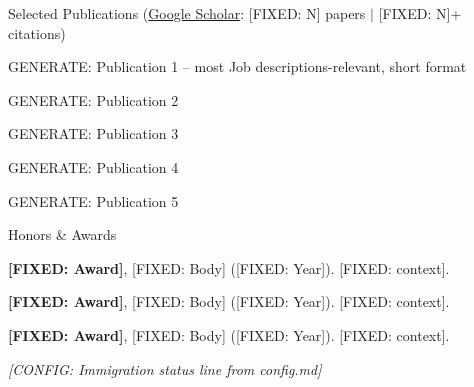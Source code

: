 \documentclass{resume}
\begin{document}
\begin{rSection2}{Selected Publications (\href{[CONFIG: Google Scholar URL]}{Google Scholar}: [FIXED: N] papers $\vert$ [FIXED: N]+ citations)}

\item [GENERATE: Publication 1 -- most Job descriptions-relevant, short format]

\item [GENERATE: Publication 2]

\item [GENERATE: Publication 3]

\item [GENERATE: Publication 4]

\item [GENERATE: Publication 5]

\end{rSection2}
\vspace{-0.15cm}


\begin{rSection2}{Honors \& Awards}
\item \textbf{[FIXED: Award]}, [FIXED: Body] ([FIXED: Year]). [FIXED: context].
\item \textbf{[FIXED: Award]}, [FIXED: Body] ([FIXED: Year]). [FIXED: context].
\item \textbf{[FIXED: Award]}, [FIXED: Body] ([FIXED: Year]). [FIXED: context].
\end{rSection2}
\vspace{-0.1cm}


\begin{center}
\vspace{0.15cm}
\textit{[CONFIG: Immigration status line from config.md]}
\end{center}
\end{document}
